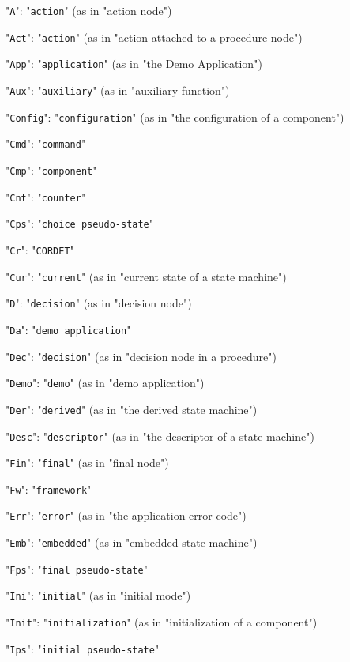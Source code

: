 \documentclass[a4paper,10pt]{article}
\newenvironment{fw_itemize}						%
{\begin{itemize}
  \setlength{\itemsep}{1mm}
  \setlength{\parskip}{0pt}
  \setlength{\parsep}{0pt}}
{\end{itemize}}
\begin{document}
\begin{fw_itemize}
\item "\texttt{A}": "\texttt{action}" (as in "action node")
\item "\texttt{Act}": "\texttt{action}" (as in "action attached to a procedure node")
\item "\texttt{App}": "\texttt{application}" (as in "the Demo Application")
\item "\texttt{Aux}": "\texttt{auxiliary}" (as in "auxiliary function")
\item "\texttt{Config}": "\texttt{configuration}" (as in "the configuration of a component")
\item "\texttt{Cmd}": "\texttt{command}"
\item "\texttt{Cmp}": "\texttt{component}"
\item "\texttt{Cnt}": "\texttt{counter}"
\item "\texttt{Cps}": "\texttt{choice pseudo-state}"
\item "\texttt{Cr}": "\texttt{CORDET}" 
\item "\texttt{Cur}": "\texttt{current}" (as in "current state of a state machine")
\item "\texttt{D}": "\texttt{decision}" (as in "decision node")
\item "\texttt{Da}": "\texttt{demo application}" 
\item "\texttt{Dec}": "\texttt{decision}" (as in "decision node in a procedure")
\item "\texttt{Demo}": "\texttt{demo}" (as in "demo application")
\item "\texttt{Der}": "\texttt{derived}" (as in "the derived state machine")
\item "\texttt{Desc}": "\texttt{descriptor}" (as in "the descriptor of a state machine")
\item "\texttt{Fin}": "\texttt{final}" (as in "final node")
\item "\texttt{Fw}": "\texttt{framework}" 
\item "\texttt{Err}": "\texttt{error}" (as in "the application error code")
\item "\texttt{Emb}": "\texttt{embedded}" (as in "embedded state machine")
\item "\texttt{Fps}": "\texttt{final pseudo-state}"
\item "\texttt{Ini}": "\texttt{initial}" (as in "initial mode")
\item "\texttt{Init}": "\texttt{initialization}" (as in "initialization of a component")
\item "\texttt{Ips}": "\texttt{initial pseudo-state}"

\end{fw_itemize}
\end{document}
